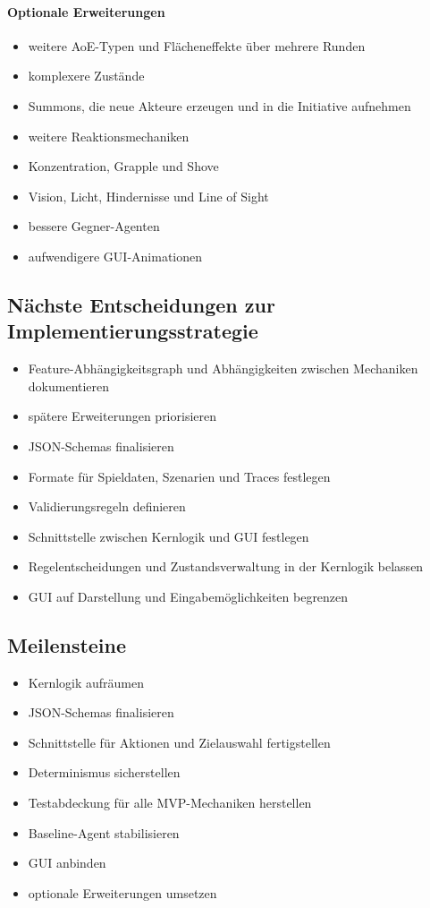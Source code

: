 \documentclass[
  12pt,
  a4paper,
  oneside,
  parskip=half,
  headings=normal
]{scrreprt}
\begin{document}
\paragraph{Optionale Erweiterungen}
\begin{itemize}
  \item weitere AoE-Typen und Flächeneffekte über mehrere Runden
  \item komplexere Zustände
  \item Summons, die neue Akteure erzeugen und in die Initiative aufnehmen
  \item weitere Reaktionsmechaniken
  \item Konzentration, Grapple und Shove
  \item Vision, Licht, Hindernisse und Line of Sight
  \item bessere Gegner-Agenten
  \item aufwendigere GUI-Animationen
\end{itemize}

\subsection{Nächste Entscheidungen zur Implementierungsstrategie}
\begin{itemize}
  \item Feature-Abhängigkeitsgraph und Abhängigkeiten zwischen Mechaniken
        dokumentieren
  \item spätere Erweiterungen priorisieren
  \item JSON-Schemas finalisieren
  \item Formate für Spieldaten, Szenarien und Traces festlegen
  \item Validierungsregeln definieren
  \item Schnittstelle zwischen Kernlogik und GUI festlegen
  \item Regelentscheidungen und Zustandsverwaltung in der Kernlogik belassen
  \item GUI auf Darstellung und Eingabemöglichkeiten begrenzen
\end{itemize}

\subsection{Meilensteine}
\begin{itemize}
  \item Kernlogik aufräumen
  \item JSON-Schemas finalisieren
  \item Schnittstelle für Aktionen und Zielauswahl fertigstellen
  \item Determinismus sicherstellen
  \item Testabdeckung für alle MVP-Mechaniken herstellen
  \item Baseline-Agent stabilisieren
  \item GUI anbinden
  \item optionale Erweiterungen umsetzen
\end{itemize}
\end{document}
